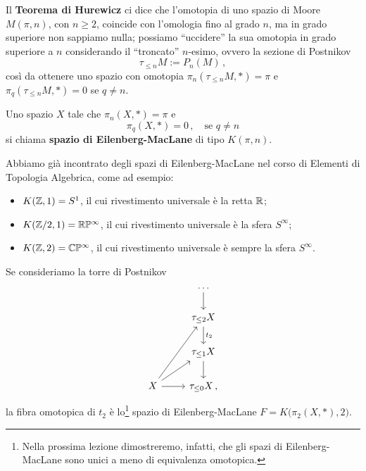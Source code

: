 Il \textbf{Teorema di Hurewicz} ci dice che l'omotopia di
uno spazio di Moore $M(\pi, n)$, con $n \ge 2$, 
coincide con l'omologia
fino al grado $n$, ma in grado superiore non sappiamo nulla;
possiamo ``uccidere'' la sua omotopia in grado superiore a $n$
considerando il ``troncato'' $n$-esimo, ovvero la sezione di Postnikov
\begin{equation*}
	\tau_{\le n}M := P_{n}(M)\,,
\end{equation*}
così da ottenere uno spazio con omotopia $\pi_{n}(\tau_{\le n}M, \ast) = \pi$ 
e $\pi_{q}(\tau_{\le n}M,\ast)=0$ se $q \ne n$.

\begin{df}
	Uno spazio $X$ tale che $\pi_{n}(X,\ast)=\pi$ e
	\begin{equation*}
		\pi_{q}(X,\ast) = 0\,, \quad \text{se } q \ne n
	\end{equation*}
	si chiama \textbf{spazio di Eilenberg-MacLane} di tipo
	$K(\pi,n)$.
\end{df}

\begin{ex}
	Abbiamo già incontrato degli spazi di Eilenberg-MacLane nel
	corso di Elementi di Topologia Algebrica, come ad esempio:
	\begin{itemize}
		\item $K({\mathbb Z},1) = S^{1}$, il cui rivestimento universale è la retta ${\mathbb R}$;
		\item $K({\mathbb Z}/2,1) = {\mathbb R}\mathbb{P}^{\infty}$, 
		il cui rivestimento universale è la sfera $S^{\infty}$;
		\item $K({\mathbb Z},2) = \mathbb{C}\mathbb{P}^{\infty}$, 
		il cui rivestimento universale è sempre la sfera $S^{\infty}$.
	\end{itemize}
\end{ex}

\begin{ex}
Se consideriamo la torre di Postnikov
\begin{equation*}
	\begin{tikzcd}
		& \dots	\ar[d] \\	
		& \tau_{\le 2}X \ar[d, "t_{2}"] \\
		& \tau_{\le 1}X \ar[d] \\
		X \ar[r] \ar[ur] \ar[uur]
		& \tau_{\le 0}X  \,,
	\end{tikzcd}
\end{equation*}
la fibra omotopica di $t_{2}$ è lo\footnote{Nella prossima lezione dimostreremo, infatti, che gli spazi di Eilenberg-MacLane sono unici a meno di equivalenza omotopica.} spazio di Eilenberg-MacLane
$F = K\big(\pi_{2}(X,\ast),2\big)$.
\end{ex}




